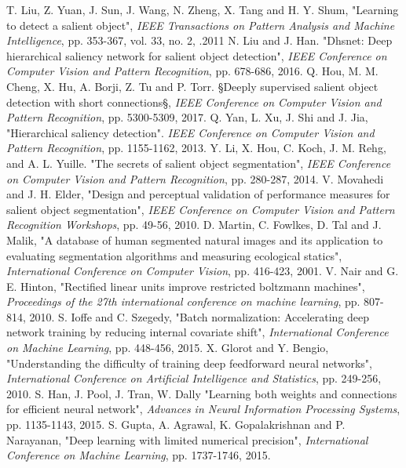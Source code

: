 \documentclass[a4paper,conference]{IEEEtran}
\begin{document}
\begin{thebibliography}{1}
T. Liu, Z. Yuan, J. Sun, J. Wang, N. Zheng, X. Tang and H. Y. Shum, "Learning to detect a salient object",  \emph{IEEE Transactions on Pattern Analysis and Machine Intelligence}, pp. 353-367, vol. 33, no. 2, .2011
N. Liu and J. Han. "Dhsnet: Deep hierarchical saliency network for salient object detection", \emph{IEEE Conference on Computer Vision and Pattern Recognition}, pp. 678-686, 2016.
Q. Hou, M. M. Cheng, X. Hu, A. Borji, Z. Tu and P. Torr. §Deeply supervised salient object detection with short connections§, \emph{IEEE Conference on Computer Vision and Pattern Recognition}, pp. 5300-5309, 2017. 
Q. Yan, L. Xu, J. Shi and J. Jia, "Hierarchical saliency detection". \emph{IEEE Conference on Computer Vision and Pattern Recognition}, pp. 1155-1162, 2013.
Y. Li, X. Hou, C. Koch, J. M. Rehg, and A. L. Yuille. "The secrets of salient object segmentation", \emph{IEEE Conference on Computer Vision and Pattern Recognition}, pp. 280-287, 2014.
V. Movahedi and J. H. Elder, "Design and perceptual validation of performance measures for salient object segmentation", \emph{IEEE Conference on Computer Vision and Pattern Recognition Workshops}, pp. 49-56, 2010.
D. Martin, C. Fowlkes, D. Tal and J. Malik, "A database of human segmented natural images and its application to evaluating segmentation algorithms and measuring ecological statics", \emph{International Conference on Computer Vision}, pp. 416-423, 2001.
V. Nair and G. E. Hinton, "Rectified linear units improve restricted boltzmann machines", \emph{Proceedings of the 27th international conference on machine learning}, pp. 807-814, 2010.
S. Ioffe and C. Szegedy, "Batch normalization: Accelerating deep network training by reducing internal covariate shift", \emph{International Conference on Machine Learning}, pp. 448-456, 2015.
X. Glorot and Y. Bengio, "Understanding the difficulty of training deep feedforward neural networks", \emph{International Conference on Artificial Intelligence and Statistics}, pp. 249-256, 2010.
S. Han, J. Pool, J. Tran, W. Dally "Learning both weights and connections for efficient neural network",  \emph{Advances in Neural Information Processing Systems}, pp. 1135-1143, 2015.
S. Gupta, A. Agrawal, K. Gopalakrishnan and P. Narayanan, "Deep learning with limited numerical precision", \emph{International Conference on Machine Learning}, pp. 1737-1746, 2015.

\end{thebibliography}

\end{document}
